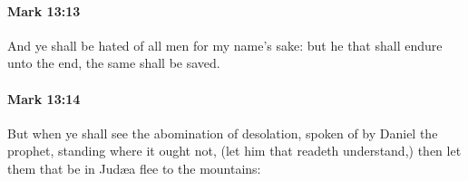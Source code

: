 		\paragraph{Mark 13:13} %
			\label{MARK-13-13}

			And ye shall be hated of all men for my name's sake: but he that shall endure unto the end, the same shall be saved.

			\begin{framed}
			\scriptsize
				\begin{compactdesc}
					\item[SBLG] 
				\end{compactdesc}
			\end{framed}

		\paragraph{Mark 13:14} %
			\label{MARK-13-14}

			But when ye shall see the abomination of desolation, spoken of by Daniel the prophet, standing where it ought not, (let him that readeth understand,) then let them that be in Judæa flee to the mountains:

